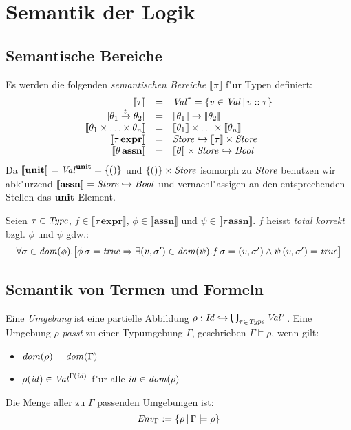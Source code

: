 \documentclass[12pt,a4paper,bigheadings]{scrartcl}
\newcommand{\semantic}[1]{\ensuremath{\llbracket#1\rrbracket}}
\newcommand{\assn}{\ensuremath{\mathbf{assn}}}
\newcommand{\atype}[1]{#1\,\assn}
\newcommand{\bexpr}{\ensuremath{\mathbf{expr}}}
\newcommand{\etype}[1]{#1\,\bexpr}
\newcommand{\tto}{\ensuremath{\xrightarrow{t}}}
\begin{document}
\section{Semantik der Logik}

\subsection{Semantische Bereiche}

Es werden die folgenden {\em semantischen Bereiche} $\semantic{\pi}$ f"ur Typen 
definiert:
\[\begin{array}{rcl}
  \semantic{\tau} & = & \Val^\tau = \{v\in\Val\,|\,\tj{v}{\tau}\} \\
  \semantic{\theta_1 \tto \theta_2} & = & \semantic{\theta_1} \to \semantic{\theta_2} \\
  \semantic{\theta_1\times\ldots\times\theta_n}&=&\semantic{\theta_1}\times\ldots\times\semantic{\theta_n} \\
  \semantic{\etype{\tau}} & = & \Store \pto \semantic{\tau} \times \Store \\
  \semantic{\atype{\theta}} & = & \semantic{\theta} \times \Store \pto \Bool
\end{array}\]
Da $\semantic{\unit} = \Val^\unit = \{()\}$ und $\{()\}\times{\text{\it Store\/}}$ isomorph zu
${\text{\it Store\/}}$ benutzen wir abk"urzend $\semantic{\assn}=\Store\pto\Bool$ und vernachl"assigen
an den entsprechenden Stellen das $\textbf{unit}$-Element.

\begin{definition}
  Seien $\tau\in{\text{\it Type\/}}$, $f\in\semantic{\etype{\tau}}$, $\phi\in\semantic{\assn}$ und
  $\psi\in\semantic{\atype{\tau}}$. $f$ heisst {\em total korrekt} bzgl. $\phi$ und
  $\psi$ gdw.:
  \[\begin{array}{l}
    \forall \sigma\in{\text{\it dom\/}}(\phi).
    \bigl[
      \phi\,\sigma = {\text{\it true\/}} 
      \Rightarrow \exists(v,\sigma')\in{\text{\it dom\/}}(\psi).f\,\sigma = (v,\sigma')\wedge \psi\,(v,\sigma')={\text{\it true\/}}
    \bigr]
  \end{array}\]
\end{definition}

\subsection{Semantik von Termen und Formeln}

Eine {\em Umgebung} ist eine partielle Abbildung $\rho:{\text{\it Id\/}}\hookrightarrow\bigcup_{\tau\in{\text{\it Type\/}}} {\text{\it Val\/}}^\tau$.
Eine Umgebung $\rho$ {\em passt} zu einer Typumgebung $\Gamma$, geschrieben $\Gamma \models \rho$,
wenn gilt:
\begin{itemize}
  \item ${\text{\it dom\/}}(\rho) = {\text{\it dom\/}}(\Gamma)$
  \item $\rho({\text{\it id\/}}) \in {\text{\it Val\/}}^{\Gamma({\text{\it id\/}})}$ f"ur alle ${\text{\it id\/}}\in{\text{\it dom\/}}(\rho)$
\end{itemize}
Die Menge aller zu $\Gamma$ passenden Umgebungen ist:
\[
  {\text{\it Env\/}}_\Gamma := \{\rho\,|\,\Gamma \models \rho\}
\]
\end{document}

